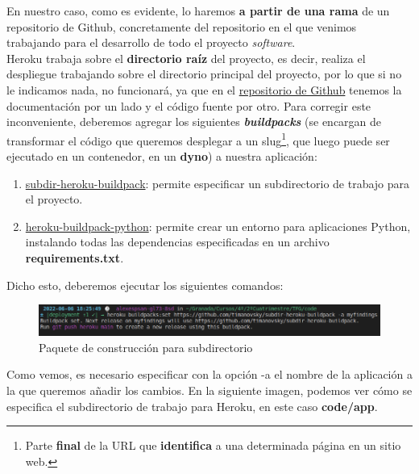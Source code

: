 En nuestro caso, como es evidente, lo haremos \textbf{a partir de una rama} de un
repositorio de Github, concretamente del repositorio en el que venimos trabajando
para el desarrollo de todo el proyecto \textit{software}.\\

Heroku trabaja sobre el \textbf{directorio raíz} del proyecto, es decir, realiza el
despliegue trabajando sobre el directorio principal del proyecto, por lo que si no le
indicamos nada, no funcionará, ya que en el \href{https://github.com/alexespana/TFG}
{repositorio de Github} tenemos la documentación por un lado y el código fuente por
otro. Para corregir este inconveniente, deberemos agregar los siguientes
\textbf{\textit{buildpacks}} (se encargan de transformar el código que queremos desplegar
a un slug\footnote{Parte \textbf{final} de la URL que \textbf{identifica} a una
determinada página en un sitio web.}, que luego puede ser ejecutado en un contenedor, en
un \textbf{dyno}) a nuestra aplicación:

    \begin{enumerate}
        \item \href{https://elements.heroku.com/buildpacks/timanovsky/subdir-heroku-buildpack}
        {subdir-heroku-buildpack}: permite especificar un subdirectorio de trabajo
        para el proyecto.
        \item \href{https://elements.heroku.com/buildpacks/heroku/heroku-buildpack-python}
        {heroku-buildpack-python}: permite crear un entorno para aplicaciones Python,
        instalando todas las dependencias especificadas en un archivo
        \textbf{requirements.txt}.
    \end{enumerate}

Dicho esto, deberemos ejecutar los siguientes comandos:

    \begin{figure}[H]
        \centering
        \includegraphics[scale=0.39]{imagenes/first-buildpack.png}
        \caption{Paquete de construcción para subdirectorio}
        \label{fig:subdir-heroku-buildpack}
    \end{figure}

Como vemos, es necesario especificar con la opción -a el nombre de la aplicación a la que
queremos añadir los cambios. En la siguiente imagen, podemos ver cómo se especifica el
subdirectorio de trabajo para Heroku, en este caso \textbf{code/app}.

